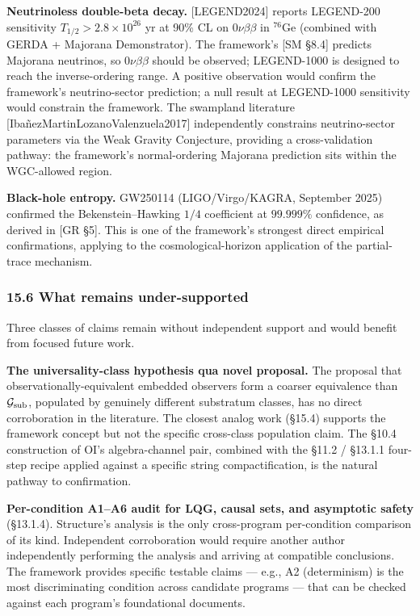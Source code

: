 \documentclass[
]{article}
\begin{document}
\textbf{Neutrinoless double-beta decay.} {[}LEGEND2024{]} reports
LEGEND-200 sensitivity \(T_{1/2} > 2.8 \times 10^{26}\) yr at 90\% CL on
\(0\nu\beta\beta\) in \(^{76}\)Ge (combined with GERDA + Majorana
Demonstrator). The framework's {[}SM §8.4{]} predicts Majorana
neutrinos, so \(0\nu\beta\beta\) should be observed; LEGEND-1000 is
designed to reach the inverse-ordering range. A positive observation
would confirm the framework's neutrino-sector prediction; a null result
at LEGEND-1000 sensitivity would constrain the framework. The swampland
literature {[}IbañezMartinLozanoValenzuela2017{]} independently
constrains neutrino-sector parameters via the Weak Gravity Conjecture,
providing a cross-validation pathway: the framework's normal-ordering
Majorana prediction sits within the WGC-allowed region.

\textbf{Black-hole entropy.} GW250114 (LIGO/Virgo/KAGRA, September 2025)
confirmed the Bekenstein--Hawking \(1/4\) coefficient at \(99.999\%\)
confidence, as derived in {[}GR §5{]}. This is one of the framework's
strongest direct empirical confirmations, applying to the
cosmological-horizon application of the partial-trace mechanism.

\hypertarget{what-remains-under-supported}{%
\subsubsection{15.6 What remains
under-supported}\label{what-remains-under-supported}}

Three classes of claims remain without independent support and would
benefit from focused future work.

\textbf{The universality-class hypothesis qua novel proposal.} The
proposal that observationally-equivalent embedded observers form a
coarser equivalence than \(\mathcal{G}_{\rm sub}\), populated by
genuinely different substratum classes, has no direct corroboration in
the literature. The closest analog work (§15.4) supports the framework
concept but not the specific cross-class population claim. The §10.4
construction of OI's algebra-channel pair, combined with the §11.2 /
§13.1.1 four-step recipe applied against a specific string
compactification, is the natural pathway to confirmation.

\textbf{Per-condition A1--A6 audit for LQG, causal sets, and asymptotic
safety} (§13.1.4). Structure's analysis is the only cross-program
per-condition comparison of its kind. Independent corroboration would
require another author independently performing the analysis and
arriving at compatible conclusions. The framework provides specific
testable claims --- e.g., A2 (determinism) is the most discriminating
condition across candidate programs --- that can be checked against each
program's foundational documents.
\end{document}
